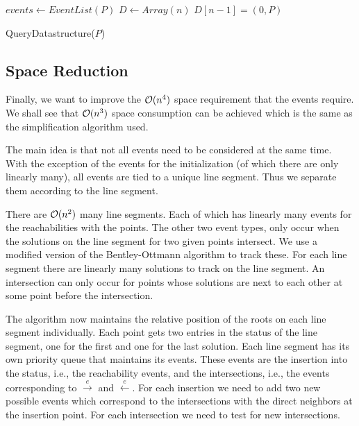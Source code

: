 \begin{algorithm}[ht]
	\(events \gets EventList(P)\)\;
	\(D \gets Array(n)\)\;
	\(D[n-1] = (0, P)\)\;
  \caption{QueryDatastructure(\(P\))}
  \label{algo:query-datastructure}
\end{algorithm}


\subsection{Space Reduction}\label{ssec:space-reduction-ds}
Finally, we want to improve the \(\mathcal{O}(n^4)\) space requirement that the events require. We shall see that \(\mathcal{O}(n^3)\) space consumption can be achieved which is the same as the simplification algorithm used. 

The main idea is that not all events need to be considered at the same time. With the exception of the events for the initialization (of which there are only linearly many), all events are tied to a unique line segment. Thus we separate them according to the line segment. 

There are \(\mathcal{O}(n^2)\) many line segments. Each of which has linearly many events for the reachabilities with the points. The other two event types, only occur when the solutions on the line segment for two given points intersect. We use a modified version of the Bentley-Ottmann algorithm to track these. For each line segment there are linearly many solutions to track on the line segment. An intersection can only occur for points whose solutions are next to each other at some point before the intersection. 

The algorithm now maintains the relative position of the roots on each line segment individually. Each point gets two entries in the status of the line segment, one for the first and one for the last solution. Each line segment has its own priority queue that maintains its events. These events are the insertion into the status, i.e., the reachability events, and the intersections, i.e., the events corresponding to \(\overset e\rightarrow\) and \(\overset e\leftarrow\). For each insertion we need to add two new possible events which correspond to the intersections with the direct neighbors at the insertion point. For each intersection we need to test for new intersections.


